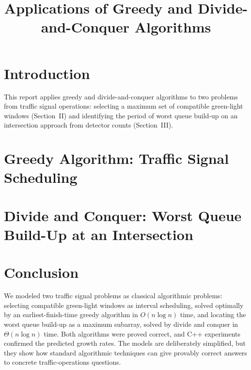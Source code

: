 \documentclass[conference]{IEEEtran}
\title{Applications of Greedy and
Divide-and-Conquer Algorithms}
\author{
    \IEEEauthorblockN{Jorge Hernandez}
    \and
    \IEEEauthorblockN{Calvin Claiborne}
}
\begin{document}
\maketitle

\section{Introduction}

This report applies greedy and divide-and-conquer
algorithms to two problems from traffic signal
operations: selecting a maximum set of compatible
green-light windows (Section~II) and identifying the
period of worst queue build-up on an intersection
approach from detector counts (Section~III).


\section{Greedy Algorithm:
Traffic Signal Scheduling}







\section{Divide and Conquer:
Worst Queue Build-Up at an Intersection}







\section{Conclusion}

We modeled two traffic signal problems as classical
algorithmic problems: selecting compatible green-light
windows as interval scheduling, solved optimally by an
earliest-finish-time greedy algorithm in $O(n\log n)$
time, and locating the worst queue build-up as a
maximum subarray, solved by divide and conquer in
$\Theta(n\log n)$ time. Both algorithms were proved
correct, and C++ experiments confirmed the predicted
growth rates. The models are deliberately simplified,
but they show how standard algorithmic techniques can
give provably correct answers to concrete
traffic-operations questions.
\end{document}
